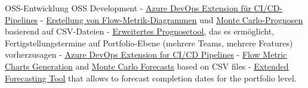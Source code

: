\begin{cvskills}
	\cvskill
	{
			{ OSS-Entwicklung }
			{ OSS Development }
	} %
	{
		{\linebreak}
		{
			- \underline{\href{https://marketplace.visualstudio.com/items?itemName=benjhuser.tfs-extensions-build-tasks}{Azure DevOps Extension für CI/CD-Pipelines}} \linebreak
			- \underline{\href{https://www.letpeople.work/flowmetricscsv}{Erstellung von Flow-Metrik-Diagrammen}} und \underline{\href{https://www.letpeople.work/montecarlocsv}{Monte Carlo-Prognosen}} basierend auf CSV-Dateien \linebreak
			- \underline{\href{https://www.letpeople.work/lighthouse}{Erweitertes Prognosetool}}, das es ermöglicht, Fertigstellungstermine auf Portfolio-Ebene (mehrere Teams, mehrere Features) vorherzusagen
		}
		{
			- \underline{ \href{https://marketplace.visualstudio.com/items?itemName=benjhuser.tfs-extensions-build-tasks}{Azure DevOps Extension for CI/CD Pipelines}} \linebreak
			- \underline{\href{https://www.letpeople.work/flowmetricscsv}{Flow Metric Charts Generation}} and \underline{\href{https://www.letpeople.work/montecarlocsv}{Monte Carlo Forecasts}} based on CSV files \linebreak
			- \underline{\href{https://www.letpeople.work/lighthouse}{Extended Forecasting Tool}} that allows to forecast completion dates for the portfolio level.
		}
	} %
\end{cvskills}
